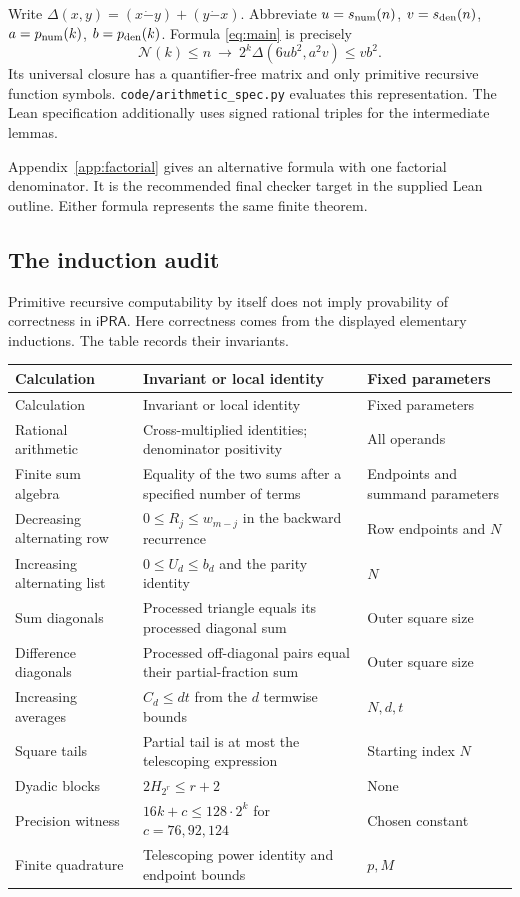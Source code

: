 \documentclass[11pt,a4paper]{article}
\theoremstyle{remark}\newtheorem{remark}[theorem]{Remark}
\newcommand{\ipra}{\mathsf{iPRA}}
\newcommand{\cut}{\mathcal N}
\newcommand{\dm}{\mathbin{\dot{-}}}
\begin{document}
Write $\Delta(x,y)=(x\dm y)+(y\dm x)$.
Abbreviate $u=s_{\rm num}(n)$, $v=s_{\rm den}(n)$,
$a=p_{\rm num}(k)$, $b=p_{\rm den}(k)$.
Formula \eqref{eq:main} is precisely
\begin{equation}\label{eq:natmain}
 \boxed{\displaystyle
 \cut(k)\le n\ \longrightarrow\
 2^k\Delta(6ub^2,a^2v)\le vb^2.}
\end{equation}
Its universal closure has a quantifier-free matrix and only
primitive recursive function symbols.
\texttt{code/arithmetic\_spec.py} evaluates this representation.
The Lean specification additionally uses signed rational triples
for the intermediate lemmas.

Appendix~\ref{app:factorial} gives an alternative formula with one
factorial denominator. It is the recommended final checker target in
the supplied Lean outline. Either formula represents the same
finite theorem.

\subsection{The induction audit}\label{sec:induction}

Primitive recursive computability by itself does not imply
provability of correctness in $\ipra$. Here correctness comes from
the displayed elementary inductions. The table records their
invariants.

\begin{longtable}{@{}>{\raggedright\arraybackslash}p{}
>{\raggedright\arraybackslash}p{.46\textwidth}
>{\raggedright\arraybackslash}p{}@{}}
\toprule
Calculation&Invariant or local identity&Fixed parameters\\
\midrule\endfirsthead
\toprule Calculation&Invariant or local identity&Fixed parameters\\
\midrule\endhead
Rational arithmetic&Cross-multiplied identities; denominator positivity&All operands\\
Finite sum algebra&Equality of the two sums after a specified number of terms&Endpoints and summand parameters\\
Decreasing alternating row&$0\le R_j\le w_{m-j}$ in the backward recurrence&Row endpoints and $N$\\
Increasing alternating list&$0\le U_d\le b_d$ and the parity identity&$N$\\
Sum diagonals&Processed triangle equals its processed diagonal sum&Outer square size\\
Difference diagonals&Processed off-diagonal pairs equal their partial-fraction sum&Outer square size\\
Increasing averages&$C_d\le dt$ from the $d$ termwise bounds&$N,d,t$\\
Square tails&Partial tail is at most the telescoping expression&Starting index $N$\\
Dyadic blocks&$2H_{2^r}\le r+2$&None\\
Precision witness&$16k+c\le128\cdot2^k$ for $c=76,92,124$&Chosen constant\\
Finite quadrature&Telescoping power identity and endpoint bounds&$p,M$\\
\bottomrule
\end{longtable}
\end{document}
